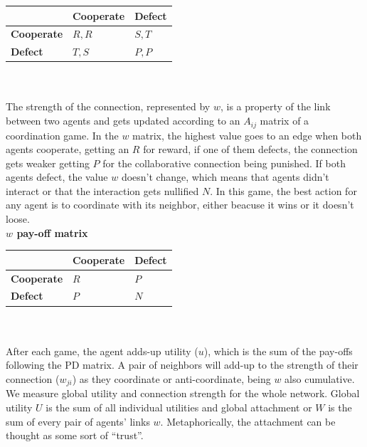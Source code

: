\documentclass[11pt]{article}
\begin{document}
\begin{tabular}{| l | l | l |}
\hline
          & \bf{Cooperate} & \bf{Defect} \\ \hline
\bf{Cooperate} &  $R,R$      &  $S,T$   \\ \hline
\bf{Defect}    &  $T,S$      &  $P,P$   \\ \hline

\end{tabular}\\ \\

The strength of the connection, represented by $w$, is a property of the link between two agents and
gets updated according to an $A_{ij}$ matrix of a coordination game. In the $w$ matrix, the highest value
goes to an edge when both agents cooperate, getting an $R$ for reward, if one of
them defects, the connection gets weaker getting $P$ for the collaborative
connection being punished. If both agents defect, the value $w$ doesn't change,
which means that agents didn't interact or that the interaction gets nullified
$N$. In this game, the best action for any agent is to coordinate with its
neighbor, either beacuse it wins or it doesn't loose. \\ 

{\bf $w$ pay-off matrix}\\

\begin{tabular}{| l | l | l |}
\hline
          & \bf{Cooperate} & \bf{Defect} \\ \hline
\bf{Cooperate} &  $R$      &  $P$   \\ \hline
\bf{Defect}    &  $P$      &  $N$   \\ \hline

\end{tabular}\\ \\


After each game, the agent adds-up utility ($u$), which is the sum of the
pay-offs following the PD matrix. A pair of neighbors will add-up to the strength of
their connection ($w_{ji}$) as they coordinate or anti-coordinate, being $w$
also cumulative. We measure global utility and connection strength for the whole
network. Global utility $U$ is the sum of all individual utilities and global
attachment or $W$ is the sum of every pair of agents' links
$w$. Metaphorically, the attachment can be thought as some sort of ``trust''.\\
\end{document}
